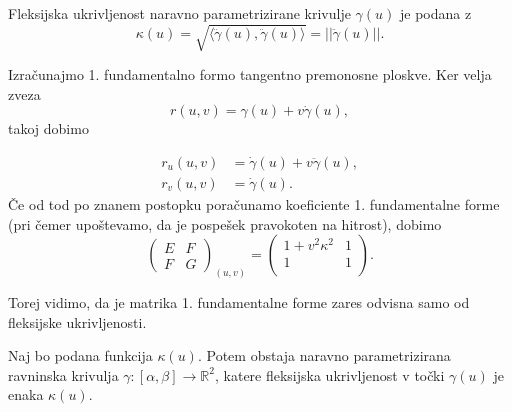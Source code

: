 \begin{definicija}
\label{def_fleksijska_ukrivljenost}
 Fleksijska ukrivljenost naravno parametrizirane krivulje $\gamma(u)$ je podana z 
 \begin{equation*} \kappa(u) = \sqrt{\langle \ddot{\gamma}(u), \ddot{\gamma}(u) \rangle } = \lvert\lvert \ddot{\gamma}(u) \rvert\rvert. \end{equation*}
\end{definicija}

Izračunajmo 1. fundamentalno formo tangentno premonosne ploskve. Ker velja zveza
\begin{equation*} r(u,v) = \gamma(u) + v \dot{\gamma}(u),\end{equation*}takoj dobimo 

\begin{align*}
    r_u(u,v) &= \dot{\gamma}(u) + v \ddot{\gamma}(u), \\
    r_v(u,v) &= \dot{\gamma}(u). 
\end{align*}
Če od tod po znanem postopku poračunamo koeficiente 1. fundamentalne forme (pri čemer upoštevamo, da je pospešek pravokoten na hitrost), dobimo 
\begin{equation*} \begin{pmatrix}
E & F \\
F & G
\end{pmatrix}_{(u,v)} = \begin{pmatrix}
  1 + v^2 \kappa^2 & 1\\
  1 & 1\\
\end{pmatrix}.\end{equation*}

Torej vidimo, da je matrika 1. fundamentalne forme zares odvisna samo od fleksijske ukrivljenosti.

\begin{trditev}
\label{trd_obstoj_krivulje_glede_na_funkcijo_fleksijske_ukrivljenosti}
 Naj bo podana funkcija $\kappa(u)$. Potem obstaja naravno parametrizirana ravninska krivulja $\gamma: [\alpha, \beta] \to  \mathbb{R}^2$, katere fleksijska ukrivljenost v točki
  $\gamma(u)$ je enaka $\kappa(u)$.
\end{trditev}

